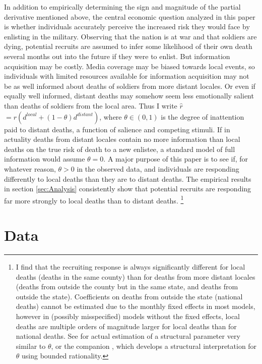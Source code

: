 \documentclass[12pt] {article}
\begin{document}
In addition to empirically determining the sign and magnitude of the
partial derivative mentioned above, the central economic question
analyzed in this paper is whether individuals accurately perceive
the increased risk they would face by enlisting in the military. Observing
that the nation is at war and that soldiers are dying, potential recruits
are assumed to infer some likelihood of their own death several months
out into the future if they were to enlist. But information acquisition
may be costly. Media coverage may be biased towards local events,
so individuals with limited resources available for information acquisition
may not be as well informed about deaths of soldiers from more distant
locales. Or even if equally well informed, distant deaths may somehow
seem less emotionally salient than deaths of soldiers from the local
area. Thus I write $\hat{r}$$=r(d^{local}+(1-\theta)d^{distant})$,
where $\theta\in(0,1)$ is the degree of inattention paid to distant
deaths, a function of salience and competing stimuli. If in actuality
deaths from distant locales contain no more information than local deaths
on the true risk of death to a new enlistee, a standard model of full information would assume
$\theta=0$. A major purpose of this paper is to see if, for whatever
reason, $\theta>0$ in the observed data, and individuals are responding
differently to local deaths than they are to distant deaths. The empirical
results in section \ref{sec:Analysis} consistently show that potential
recruits are responding far more strongly to local deaths than to
distant deaths. %
\footnote{I find that the recruiting response is always significantly different
for local deaths (deaths in the same county) than for deaths from
more distant locales (deaths from outside the county but in the same
state, and deaths from outside the state). Coefficients on deaths from outside the state (national deaths) cannot be estimated due to the monthly fixed effects in most models, however in (possibly misspecified) models without the fixed effects, local deaths
are multiple orders of magnitude larger for local deaths than
for national deaths. See \cite{ChettySalience} for actual estimation
of a structural parameter very similar to $\theta$, or the companion \cite{ChettyEarly},
which develops a structural interpretation for $\theta$ using bounded
rationality.%
}


\section{Data\label{sec:Data}}
\end{document}
